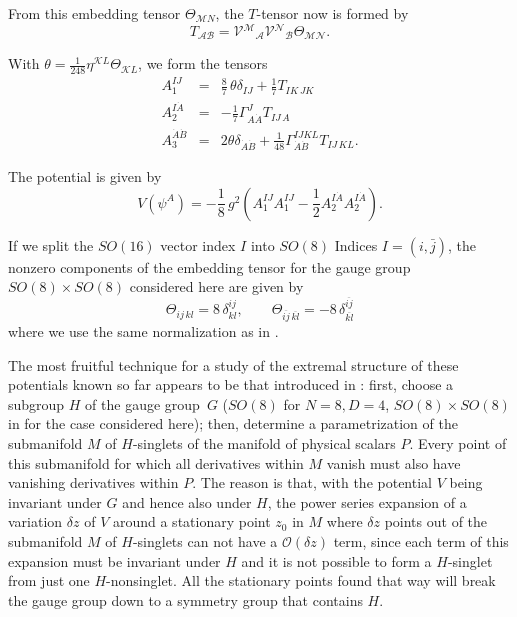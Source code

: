 \documentclass[a4paper,12pt]{article}
\begin{document}
From this embedding tensor $\Theta_{\mathcal MN}$, the $T$-tensor now
is formed by
\begin{equation}
T_{\mathcal{AB}}={\mathcal{V}}{}^{\mathcal M}{}_{\mathcal A}{\mathcal{V}}{}^{\mathcal N}{}_{\mathcal B}\Theta_{\mathcal{MN}}.
\end{equation}

With $\theta=\frac{1}{248}\eta^{\mathcal KL}\Theta_{\mathcal KL}$, we
form the tensors
\begin{equation}
\begin{array}{lll}
A_1^{IJ}&=&\frac{8}{7}\,\theta\delta_{IJ}+\frac{1}{7}T_{IK\,JK}\\
A_2^{I\dot A}&=&-\frac{1}{7}\Gamma^{J}_{A\dot A}T_{IJ\,A}\\
A_3^{\dot A\dot B}&=&2\theta\delta_{\dot A\dot B}+\frac{1}{48}\Gamma^{IJKL}_{\dot A\dot B}T_{IJ\,KL}.
\end{array}
\end{equation}

The potential is given by
\begin{equation}
V\left(\psi^A\right)=-\frac{1}{8}\,g^2\left(A_1^{IJ}A_1^{IJ}-\frac{1}{2}A_2^{I\dot A}A_2^{I\dot A}\right).
\end{equation}

If we split the $SO(16)$ vector index $I$ into $SO(8)$ Indices
$I=(i,\bar j)$, the nonzero components of the embedding tensor for
the gauge group $SO(8)\times SO(8)$ considered here are given by
\begin{equation}
\Theta_{ij\,kl}=8\,\delta^{ij}_{kl},\qquad \Theta_{\overline{ij}\,\overline{kl}}=-8\,\delta^{\overline{ij}}_{\overline{kl}}
\end{equation}
where we use the same normalization as in \cite{Nicolai:2001sv}.


The most fruitful technique for a study of the extremal structure of
these potentials known so far appears to be that introduced in
\cite{Warner:vz}: first, choose a subgroup $H$ of the gauge group~$G$
($SO(8)$ for $N=8, D=4$, 
$SO(8)\times SO(8)$ in for the case considered here); then, determine
a parametrization of the submanifold $M$ of $H$-singlets of the
manifold of physical scalars $P$. Every point of this submanifold for
which all derivatives within $M$ vanish must also have vanishing
derivatives within $P$. The reason is that, with the potential $V$
being invariant under $G$ and hence also under $H$, the power series
expansion of a variation $\delta z$ of $V$ around a stationary point
$z_0$ in $M$ where $\delta z$ points out of the submanifold $M$ of
$H$-singlets can not have a $\mathcal{O}(\delta z)$ term, since each
term of this expansion must be invariant under $H$ and it is not
possible to form a $H$-singlet from just one $H$-nonsinglet. All the
stationary points found that way will break the gauge group down to a
symmetry group that contains $H$.
\end{document}
